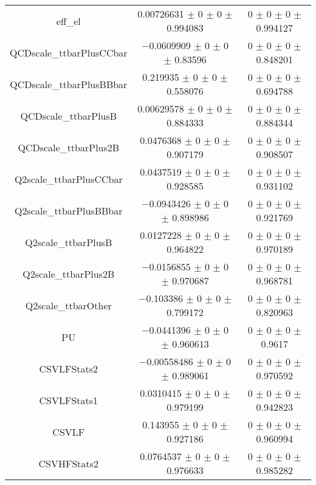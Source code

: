 \begin{table}
\begin{tabular}{ccc}
eff\_el & \num{0.00726631} $\pm$ \num{0} $\pm$ \num{0} $\pm$ \num{0.994083} & \num{0} $\pm$ \num{0} $\pm$ \num{0} $\pm$ \num{0.994127}\\
QCDscale\_ttbarPlusCCbar & \num{-0.0609909} $\pm$ \num{0} $\pm$ \num{0} $\pm$ \num{0.83596} & \num{0} $\pm$ \num{0} $\pm$ \num{0} $\pm$ \num{0.848201}\\
QCDscale\_ttbarPlusBBbar & \num{0.219935} $\pm$ \num{0} $\pm$ \num{0} $\pm$ \num{0.558076} & \num{0} $\pm$ \num{0} $\pm$ \num{0} $\pm$ \num{0.694788}\\
QCDscale\_ttbarPlusB & \num{0.00629578} $\pm$ \num{0} $\pm$ \num{0} $\pm$ \num{0.884333} & \num{0} $\pm$ \num{0} $\pm$ \num{0} $\pm$ \num{0.884344}\\
QCDscale\_ttbarPlus2B & \num{0.0476368} $\pm$ \num{0} $\pm$ \num{0} $\pm$ \num{0.907179} & \num{0} $\pm$ \num{0} $\pm$ \num{0} $\pm$ \num{0.908507}\\
Q2scale\_ttbarPlusCCbar & \num{0.0437519} $\pm$ \num{0} $\pm$ \num{0} $\pm$ \num{0.928585} & \num{0} $\pm$ \num{0} $\pm$ \num{0} $\pm$ \num{0.931102}\\
Q2scale\_ttbarPlusBBbar & \num{-0.0943426} $\pm$ \num{0} $\pm$ \num{0} $\pm$ \num{0.898986} & \num{0} $\pm$ \num{0} $\pm$ \num{0} $\pm$ \num{0.921769}\\
Q2scale\_ttbarPlusB & \num{0.0127228} $\pm$ \num{0} $\pm$ \num{0} $\pm$ \num{0.964822} & \num{0} $\pm$ \num{0} $\pm$ \num{0} $\pm$ \num{0.970189}\\
Q2scale\_ttbarPlus2B & \num{-0.0156855} $\pm$ \num{0} $\pm$ \num{0} $\pm$ \num{0.970687} & \num{0} $\pm$ \num{0} $\pm$ \num{0} $\pm$ \num{0.968781}\\
Q2scale\_ttbarOther & \num{-0.103386} $\pm$ \num{0} $\pm$ \num{0} $\pm$ \num{0.799172} & \num{0} $\pm$ \num{0} $\pm$ \num{0} $\pm$ \num{0.820963}\\
PU & \num{-0.0441396} $\pm$ \num{0} $\pm$ \num{0} $\pm$ \num{0.960613} & \num{0} $\pm$ \num{0} $\pm$ \num{0} $\pm$ \num{0.9617}\\
CSVLFStats2 & \num{-0.00558486} $\pm$ \num{0} $\pm$ \num{0} $\pm$ \num{0.989061} & \num{0} $\pm$ \num{0} $\pm$ \num{0} $\pm$ \num{0.970592}\\
CSVLFStats1 & \num{0.0310415} $\pm$ \num{0} $\pm$ \num{0} $\pm$ \num{0.979199} & \num{0} $\pm$ \num{0} $\pm$ \num{0} $\pm$ \num{0.942823}\\
CSVLF & \num{0.143955} $\pm$ \num{0} $\pm$ \num{0} $\pm$ \num{0.927186} & \num{0} $\pm$ \num{0} $\pm$ \num{0} $\pm$ \num{0.960994}\\
CSVHFStats2 & \num{0.0764537} $\pm$ \num{0} $\pm$ \num{0} $\pm$ \num{0.976633} & \num{0} $\pm$ \num{0} $\pm$ \num{0} $\pm$ \num{0.985282}\\

\end{tabular}
\end{table}
